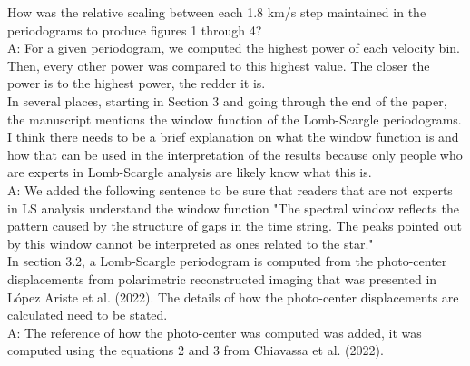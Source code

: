 \documentclass{article}
\begin{document}
How was the relative scaling between each 1.8 km/s step maintained in the periodograms to
produce figures 1 through 4?\\

A: For a given periodogram, we computed the highest power of each velocity bin. Then, every other power was compared to this highest value. The closer the power is to the highest power, the redder it is.  \\

In several places, starting in Section 3 and going through the end of the paper, the manuscript
mentions the window function of the Lomb-Scargle periodograms. I think there needs to be a
brief explanation on what the window function is and how that can be used in the interpretation
of the results because only people who are experts in Lomb-Scargle analysis are likely know
what this is.\\

A: We added the following sentence to be sure that readers that are not experts in LS analysis understand the window function "The spectral window reﬂects the pattern caused by the structure of gaps in the time string. The peaks pointed out by this window cannot be interpreted as ones related to the star."\\

In section 3.2, a Lomb-Scargle periodogram is computed from the photo-center displacements
from polarimetric reconstructed imaging that was presented in López Ariste et al. (2022). The
details of how the photo-center displacements are calculated need to be stated.\\

A: The reference of how the photo-center was computed was added, it was computed using the equations 2 and 3 from Chiavassa et al. (2022).\\
\end{document}
